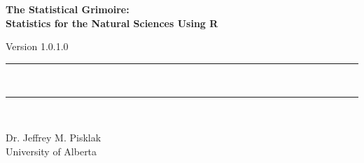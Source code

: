{}
{
\Huge\bfseries\centering\headingfont The Statistical Grimoire: \\
Statistics for the Natural Sciences Using R\\

\vspace{1em}

\small\mdseries\raggedright Version 1.0.1.0

\rule{\linewidth}{1pt}\\[-6mm]
\rule{\linewidth}{2pt}\\

}

\vskip 2cm

\begin{center}
\Large Dr. Jeffrey M. Pisklak \\
\vspace{0.5em}
\large University of Alberta
\end{center}

\vfill

